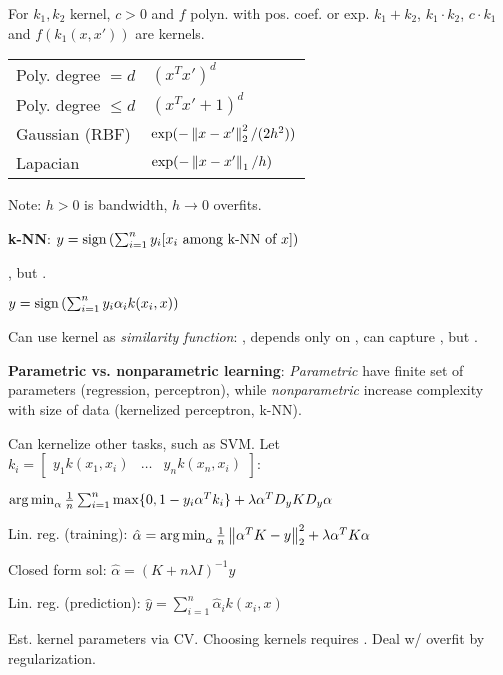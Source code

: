 For $k_1, k_2$ kernel, $c > 0$ and $f$ polyn. with pos. coef. or exp.
$k_1 + k_2$, $k_1 \cdot k_2$, $c \cdot k_1$ and $f(k_1(x,x'))$
are kernels.

\begin{tabular}{ll}
    Poly. degree $= d$ & $(x^T x')^d$ \\
    Poly. degree $\leq d$ & $(x^T x' + 1)^d$ \\
    Gaussian (RBF) & $\exp(-\left\lVert x-x'\right\rVert_2^2/(2h^2))$ \\
    Lapacian & $\exp(-\left\lVert x-x'\right\rVert_1/h)$ \\
\end{tabular}

Note: $h > 0$ is bandwidth, $h \rightarrow 0$ overfits.

\textbf{k-NN}: $y = \operatorname*{sign}\left(\sum_{i=1}^n y_i [\text{$x_i$ among k-NN of $x$}]\right)$

, but .

\centerline{$y = \operatorname*{sign}\left(\sum_{i=1}^n y_i \alpha_i k(x_i, x)\right)$}

Can use kernel as \emph{similarity function}: , depends only on
, can capture , but .

\textbf{Parametric vs. nonparametric learning}: \emph{Parametric} have finite set of parameters (regression, perceptron), while
\emph{nonparametric} increase complexity with size of data (kernelized perceptron, k-NN).

Can kernelize other tasks, such as SVM. Let $k_i =
\begin{bmatrix}y_1 k(x_1,x_i) & \dots & y_n k(x_n, x_i) \end{bmatrix}$:

$\operatorname*{arg\,min}_\alpha \frac{1}{n} \sum_{i=1}^n \max\{0, 1-y_i\alpha^Tk_i\} + \lambda \alpha^TD_y K D_y \alpha$

Lin. reg. (training): $\hat{\alpha} = \operatorname*{arg\,min}_\alpha \frac{1}{n} \left\lVert\alpha^TK-y\right\rVert_2^2 + \lambda \alpha^T K \alpha$

Closed form sol: $\hat{\alpha} = (K + n \lambda I)^{-1} y$

Lin. reg. (prediction): $\hat{y} = \sum_{i=1}^n \hat{\alpha}_i k(x_i, x)$


Est. kernel parameters via CV. Choosing kernels requires . Deal w/ overfit by regularization.
